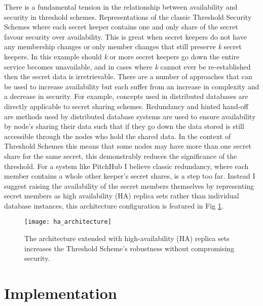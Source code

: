 There is a fundamental tension in the relationship between availability and security in threshold schemes. Representations of the classic Threshold Security Schemes where each secret keeper contains one and only share of the secret favour security over availability. This is great when secret keepers do not have any membership changes or only member changes that still preserve \textit{k} secret keepers. In this example should \textit{k} or more secret keepers go down the entire service becomes unavailable, and in cases where \textit{k} cannot ever be re-established then the secret data is irretrievable. There are a number of approaches that can be used to increase availability but each suffer from an increase in complexity and a decrease in security. For example, concepts used in distributed databases are directly applicable to secret sharing schemes. Redundancy and hinted hand-off are methods used by distributed database systems are used to ensure availability by node's sharing their data such that if they go down the data stored is still accessible through the nodes who hold the shared data. In the context of Threshold Schemes this means that some nodes may have more than one secret share for the same secret, this demonstrably reduces the significance of the threshold. For a system like PitchHub I believe classic redundancy, where each member contains a whole other keeper's secret shares, is a step too far. Instead I suggest raising the availability of the secret members themselves by representing secret members as high availability (HA) replica sets rather than individual database instances, this architecture configuration is featured in Fig \ref{fig:architecture_high_availability}.

\begin{figure}[ht]
    \centering
    \texttt{[image: ha\_architecture]}
    \caption{The architecture extended with high-availability (HA) replica sets increases the Threshold Scheme's robustness without compromising security.}
    \label{fig:architecture_high_availability}
\end{figure}

\section{Implementation}

